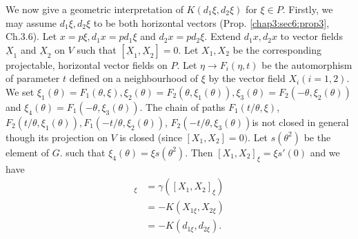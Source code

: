 We now give a geometric interpretation of $K(d_1 \xi , d_2 \xi)$ for
$\xi \in P$. Firstly, we may assume $d_1 \xi , d_2 \xi$ to be both
horizontal vectors (Prop. \ref{chap3:sec6:prop3}, Ch.3.6). Let $x = p \xi, d_1 x = pd_1
\xi$ and $d_2 x = pd_2 \xi$. Extend $d_1 x , d_2 x$ to vector fields
$\underbar{X}_1$ and $\underbar{X}_2$ on $V$ such that $[
  \underbar{X}_1, \underbar{X}_2] =0$. Let $X_1, X_2$ be the
corresponding projectable, horizontal vector fields on $P $. Let $\eta
\to F_i (\eta, t)$ be the automorphism of parameter $t$ defined on a
neighbourhood of $\xi$ by the vector field $X_i (i=1, 2)$. We set
$\xi_1(\theta) = F_1 (\theta , \xi), \xi_2 (\theta) = F_2 (\theta,
\xi_1(\theta)), \xi_3(\theta) = F_2(-\theta, \xi_2(\theta))$ and
$\xi_4 (\theta) =F_1 (-\theta, \xi_3 (\theta))$. The chain of paths
$F_1(t/ \theta, \xi)$, $F_2(t/ \theta , \xi_1 (\theta)), F_1 (-t/
\theta , \xi_2 (\theta))$, $F_2(-t / \theta , \xi_3 (\theta))$\pageoriginale is not
closed in general though its projection on $V$ is closed (since $[X_1,
  X_2] =0)$. 
Let $s(\theta^2)$ be the element of $G$. such that $\xi_4 (\theta) =
\xi s (\theta^2)$. Then $[X_1, X_2]_{\xi} = \xi s'(0)$ and we have  
\begin{align*}
  [X_1, X_2]_{\xi} & = \gamma([X_1, X_2]_{\xi})\\
  & = -K(X_{1 \xi}, X_{2 \xi})\\
  & = -K(d_{1 \xi}, d_{2 \xi}).
\end{align*}
\begin{figure}[H]
\end{figure}
